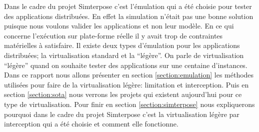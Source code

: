 Dans le cadre du projet Simterpose c'est l'émulation qui a été choisie pour tester des applications distribuées. En effet la simulation n'était pas une bonne solution puisque nous voulons valider les applications et non leur modèle. En ce qui concerne l'exécution sur plate-forme réelle il y avait trop de contraintes matérielles à satisfaire. Il existe deux types d'émulation pour les applications distribuées; la virtualisation standard et la ``légère''. On parle de virtualisation ``légère'' quand on souhaite tester des applications sur une centaine d'instances. Dans ce rapport nous allons présenter en section \ref{section:emulation} les méthodes utilisées pour faire de la virtualisation légère: limitation et interception. Puis en section \ref{section:sota} nous verrons les projets qui existent aujourd'hui pour ce type de virtualisation. Pour finir en section \ref{section:simterpose} nous expliquerons pourquoi dans le cadre du projet Simterpose c'est la virtualisation légère par interception qui a été choisie et comment elle fonctionne.
